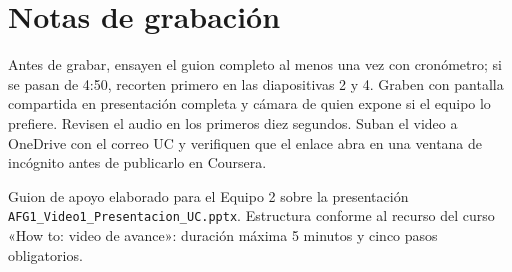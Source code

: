 \section{Notas de grabación}

\begin{nota}
\small
Antes de grabar, ensayen el guion completo al menos una vez con cronómetro; si se pasan de 4:50, recorten primero en las diapositivas 2 y 4. Graben con pantalla compartida en presentación completa y cámara de quien expone si el equipo lo prefiere. Revisen el audio en los primeros diez segundos. Suban el video a OneDrive con el correo UC y verifiquen que el enlace abra en una ventana de incógnito antes de publicarlo en Coursera.
\end{nota}

\vspace{0.4cm}
{\color{gris}\small Guion de apoyo elaborado para el Equipo 2 sobre la presentación \texttt{AFG1\_Video1\_Presentacion\_UC.pptx}. Estructura conforme al recurso del curso «How to: video de avance»: duración máxima 5 minutos y cinco pasos obligatorios.\par}


